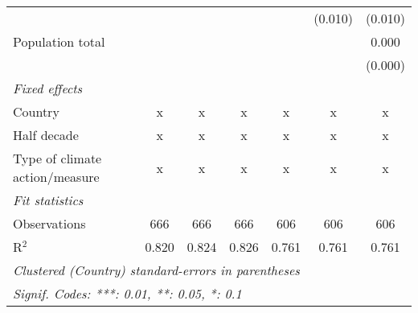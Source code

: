 \begin{tabular}{lcccccc}
                                                          &              &               &               &               & (0.010)       & (0.010)\\   
   Population total                                       &              &               &               &               &               & 0.000\\   
                                                          &              &               &               &               &               & (0.000)\\   
   \emph{Fixed effects}\\
   Country                                                & x            & x             & x             & x             & x             & x\\  
   Half decade                                            & x            & x             & x             & x             & x             & x\\  
   Type of climate action/measure                         & x            & x             & x             & x             & x             & x\\  
   \midrule \emph{Fit statistics}\\
   Observations                                           & 666          & 666           & 666           & 606           & 606           & 606\\  
   R$^2$                                                  & 0.820        & 0.824         & 0.826         & 0.761         & 0.761         & 0.761\\  
   \midrule
   \multicolumn{7}{l}{\emph{Clustered (Country) standard-errors in parentheses}}\\
   \multicolumn{7}{l}{\emph{Signif. Codes: ***: 0.01, **: 0.05, *: 0.1}}\\
\end{tabular}
\par\endgroup


